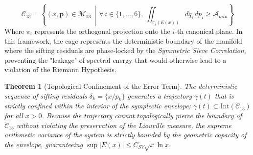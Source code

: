 \documentclass[sn-mathphys-num, pdflatex, referee]{sn-jnl}
\newtheorem{theorem}{Theorem}[section]
\begin{document}
\begin{equation}
\mathcal{C}_{13} = \left\{ (x, \mathbf{p}) \in \mathcal{M}_{13} \, \middle| \, \forall \, i \in \{1, \dots, 6\}, \, \iint_{\pi_i(E(x))} dq_i \, dp_i \ge \mathcal{A}_{min} \right\}
\end{equation}
Where $\pi_i$ represents the orthogonal projection onto the $i$-th canonical plane.
In this framework, the cage represents the deterministic boundary of the manifold where the sifting residuals are phase-locked by the \textit{Symmetric Sieve Correlation}, preventing the "leakage" of spectral energy that would otherwise lead to a violation of the Riemann Hypothesis.
\begin{theorem}[Topological Confinement of the Error Term]
The deterministic sequence of sifting residuals $\delta_k = \{x/p_k\}$ generates a trajectory $\gamma(t)$ that is strictly confined within the interior of the symplectic envelope: $\gamma(t) \subset \text{Int}(\mathcal{C}_{13})$ for all $x > 0$. Because the trajectory cannot topologically pierce the boundary of $\mathcal{C}_{13}$ without violating the preservation of the Liouville measure, the supreme arithmetic variance of the system is strictly bounded by the geometric capacity of the envelope, guaranteeing $\sup |E(x)| \le C_{SV} \sqrt{x} \ln x$.
\end{theorem}
\end{document}
